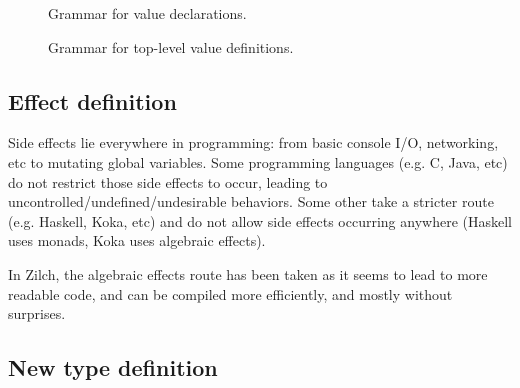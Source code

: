 \begin{figure}[H]
	\centering


	\caption{Grammar for value declarations.}
	\label{fig:zilch-grammar-declarations-value-grammar}
\end{figure}

\begin{figure}[H]
	\centering


	\caption{Grammar for top-level value definitions.}
	\label{fig:zilch-grammar-declarations-value-toplevel-grammar}
\end{figure}

\subsection{Effect definition}\label{subsec:zilch-grammar-declaration-effect}

Side effects lie everywhere in programming: from basic console I/O, networking, etc to mutating global variables.
Some programming languages (e.g. C, Java, etc) do not restrict those side effects to occur, leading to uncontrolled/undefined/undesirable behaviors.
Some other take a stricter route (e.g. Haskell, Koka, etc) and do not allow side effects occurring anywhere (Haskell uses monads, Koka uses algebraic effects).

In Zilch, the algebraic effects route has been taken as it seems to lead to more readable code, and can be compiled more efficiently, and mostly without surprises.


\subsection{New type definition}\label{subsec:zilch-grammar-declarations-type}


